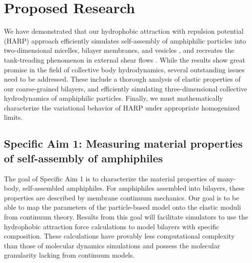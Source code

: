 \section{Proposed Research}
\label{sec:proposed-work}
We have demonstrated that our hydrophobic attraction with repulsion potential (HARP) approach efficiently simulates
self-assembly of amphiphilic particles into two-dimensional micelles, bilayer membranes, and vesicles \cite{Fu2018_SIAM}, and
recreates the tank-treading phenomenon in external shear flows
\cite{Fu20}.
%
While the results show great promise in the field of collective body hydrodynamics,
several outstanding issues need to be addressed. These include a thorough 
analysis of elastic properties of our coarse-grained bilayers, and 
efficiently simulating three-dimensional collective hydrodynamics of amphiphilic particles.
Finally, we must mathematically characterize the variational behavior of HARP under appropriate homogenized limits.

\subsection{Specific Aim 1: Measuring material properties of self-assembly of amphiphiles}
\label{subsec:specific_aim_1}

The goal of Specific Aim 1 is to characterize the material properties of many-body, self-assembled amphiphiles.
For amphiphiles assembled into bilayers, these properties are described by membrane continuum mechanics.
Our goal is to be able to map the parameters of the particle-based model onto the elastic moduli from continuum theory.
Results from this goal will facilitate simulators to use the hydrophobic attraction force calculations
to model bilayers with specific composition. These calculations have provably less computational complexity than
those of molecular dynamics simulations and possess the molecular granularity lacking from continuum models.

